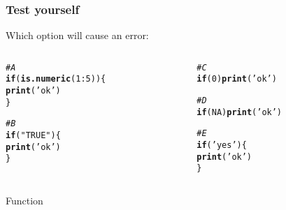 \documentclass[12pt]{beamer}\usepackage[]{graphicx}\usepackage[]{color}
\makeatletter
\newcommand{\hlnum}[1]{\textcolor[rgb]{0.686,0.059,0.569}{#1}}%
\newcommand{\hlstr}[1]{\textcolor[rgb]{0.192,0.494,0.8}{#1}}%
\newcommand{\hlcom}[1]{\textcolor[rgb]{0.678,0.584,0.686}{\textit{#1}}}%
\newcommand{\hlopt}[1]{\textcolor[rgb]{0,0,0}{#1}}%
\newcommand{\hlstd}[1]{\textcolor[rgb]{0.345,0.345,0.345}{#1}}%
\newcommand{\hlkwa}[1]{\textcolor[rgb]{0.161,0.373,0.58}{\textbf{#1}}}%
\newcommand{\hlkwd}[1]{\textcolor[rgb]{0.737,0.353,0.396}{\textbf{#1}}}%
\newenvironment{kframe}{%
 \def\at@end@of@kframe{}%
 \ifinner\ifhmode%
  \def\at@end@of@kframe{\end{minipage}}%
  \begin{minipage}{\columnwidth}%
 \fi\fi%
 \def\FrameCommand##1{\hskip\@totalleftmargin \hskip-\fboxsep
 \colorbox{shadecolor}{##1}\hskip-\fboxsep
     \hskip-\linewidth \hskip-\@totalleftmargin \hskip\columnwidth}%
 \MakeFramed {\advance\hsize-\width
   \@totalleftmargin\z@ \linewidth\hsize
   \@setminipage}}%
 {\par\unskip\endMakeFramed%
 \at@end@of@kframe}
\newenvironment{knitrout}{}{} %
\makeatother
\begin{document}
\begin{frame}[fragile]
\frametitle{Test yourself}

Which option will cause an error:
\begin{columns}[t]
\begin{column}{0.45\textwidth}
\begin{knitrout}\footnotesize
{}\color{fgcolor}\begin{kframe}
\begin{alltt}
\hlcom{# A}
\hlkwa{if} \hlstd{(}\hlkwd{is.numeric}\hlstd{(}\hlnum{1}\hlopt{:}\hlnum{5}\hlstd{)) \{}
  \hlkwd{print}\hlstd{(}\hlstr{'ok'}\hlstd{)}
\hlstd{\}}


\hlcom{# B}
\hlkwa{if} \hlstd{(}\hlstr{"TRUE"}\hlstd{) \{}
  \hlkwd{print}\hlstd{(}\hlstr{'ok'}\hlstd{)}
\hlstd{\}}
\end{alltt}
\end{kframe}
\end{knitrout}
\end{column}

\begin{column}{0.45\textwidth}
\begin{knitrout}\footnotesize
{}\color{fgcolor}\begin{kframe}
\begin{alltt}
\hlcom{# C}
\hlkwa{if} \hlstd{(}\hlnum{0}\hlstd{)} \hlkwd{print}\hlstd{(}\hlstr{'ok'}\hlstd{)}


\hlcom{# D}
\hlkwa{if} \hlstd{(}\hlnum{NA}\hlstd{)} \hlkwd{print}\hlstd{(}\hlstr{'ok'}\hlstd{)}


\hlcom{# E}
\hlkwa{if} \hlstd{(}\hlstr{'yes'}\hlstd{) \{}
  \hlkwd{print}\hlstd{(}\hlstr{'ok'}\hlstd{)}
\hlstd{\}}
\end{alltt}
\end{kframe}
\end{knitrout}
\end{column}
\end{columns}

\end{frame}


\begin{frame}
\begin{center}
\Huge{Function }
\end{center}
\end{frame}

\end{document}
